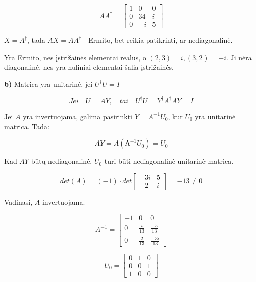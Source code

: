 \documentclass{article}
\begin{document}
\[
    AA^\dag = 
    \begin{bmatrix}
        1 & 0 & 0 \\
        0 & 34 & i \\
        0 & -i & 5
    \end{bmatrix}
\]

$X=A^\dag$, tada $AX = AA^\dag$ - Ermito, bet reikia patikrinti, ar nediagonalinė.

\hfill \break

Yra Ermito, nes įstrižainės elementai realūs, o $(2,3) = i, (3,2) = -i$. Ji nėra diagonalinė, nes yra nuliniai elementai šalia įstrižainės.

\hfill \break

\textbf{b)}
Matrica yra unitarinė, jei $U^{\dag}U = I $

\[
    Jei \quad U= AY, \quad tai \quad U^{\dag}U = Y^{\dag}A^{\dag}AY = I
\]

Jei $A$ yra invertuojama, galima pasirinkti $Y=A^{-1}U_0$, kur $U_0$ yra unitarinė matrica. Tada:

\begin{equation}
    AY = A( А^{-1} U_{0}) = U_{0} \nonumber
\end{equation}

Kad $AY$ būtų nediagonalinė, $U_0$ turi būti nediagonalinė unitarinė matrica.

\begin{equation}
    det(A) =
    (-1) \cdot det
    \begin{bmatrix}
        -3i & 5 \\
        -2 & i
    \end{bmatrix}
    = -13 \neq 0 \nonumber
\end{equation}

Vadinasi, $A$ invertuojama.

\begin{equation}
    A^{-1} =
    \begin{bmatrix}
        -1 & 0 & 0 \\
        0 & \frac{i}{13} & \frac{-5}{13} \\
        0 & \frac{2}{13} & \frac{-3i}{13} \nonumber
    \end{bmatrix}
\end{equation}


\begin{equation}
    U_0 =
    \begin{bmatrix}
       0 & 1 & 0 \\
       0 & 0 & 1 \\
       1 & 0 & 0 \nonumber
    \end{bmatrix}
\end{equation}
\end{document}

